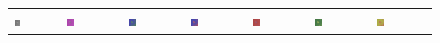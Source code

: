 \begin{figure}[h!]
	\setlength\tabcolsep{1pt}
	\def\arraystretch{0.5}
	\begin{tabular}{C{0.14\textwidth}C{0.14\textwidth}C{0.14\textwidth}C{0.14\textwidth}C{0.14\textwidth}C{0.14\textwidth}C{0.14\textwidth}}
		\includegraphics[width=0.14\textwidth]{images/p03/p03_01.png} &
		\includegraphics[width=0.14\textwidth]{images/gen/number_of_segments/p03_01.png_5.png} &
		\includegraphics[width=0.14\textwidth]{images/gen/number_of_segments/p03_01.png_10.png} &
		\includegraphics[width=0.14\textwidth]{images/gen/number_of_segments/p03_01.png_20.png} &
		\includegraphics[width=0.14\textwidth]{images/gen/number_of_segments/p03_01.png_50.png} &
		\includegraphics[width=0.14\textwidth]{images/gen/number_of_segments/p03_01.png_75.png} &
		\includegraphics[width=0.14\textwidth]{images/gen/number_of_segments/p03_01.png_100.png} \\

\end{tabular}
\end{figure}
